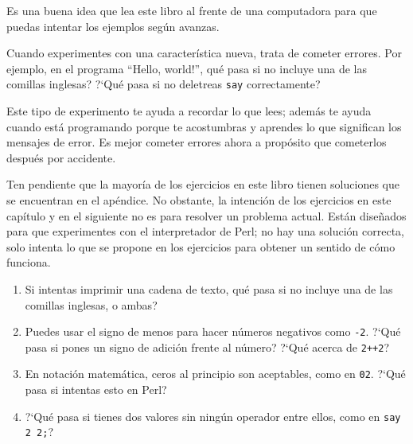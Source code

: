 \begin{exercise}

Es una buena idea que lea este libro al frente de una computadora
para que puedas intentar los ejemplos según avanzas. 

Cuando experimentes con una característica nueva, 
trata de cometer errores. Por ejemplo, en el programa ``Hello, world!'',
qué pasa si no incluye una de las comillas inglesas? ?`Qué pasa si no
deletreas {\tt say} correctamente?

Este tipo de experimento te ayuda a recordar lo que lees; además
te ayuda cuando está programando porque te acostumbras y aprendes
lo que significan los mensajes de error. Es mejor cometer errores
ahora a propósito que cometerlos después por accidente.

Ten pendiente que la mayoría de los ejercicios en este libro
tienen soluciones que se encuentran en el apéndice. No obstante, 
la intención de los ejercicios en este capítulo y en el siguiente 
no es para resolver un problema actual. Están diseñados para que 
experimentes con el interpretador de Perl; no hay una solución correcta, 
solo intenta lo que se propone en los ejercicios para 
obtener un sentido de cómo funciona.

\begin{enumerate}

\item Si intentas imprimir una cadena de texto, qué pasa si no incluye 
una de las comillas inglesas, o ambas?

\item Puedes usar el signo de menos para hacer números negativos como 
{\tt -2}. ?`Qué pasa si pones un signo de adición frente al número?
?`Qué acerca de {\tt 2++2}?

\item En notación matemática, ceros al principio son aceptables, como en 
{\tt 02}. ?`Qué pasa si intentas esto en Perl?

\item ?`Qué pasa si tienes dos valores sin ningún operador entre ellos,
como en {\tt say 2 2;}?

\end{enumerate}

\end{exercise}



